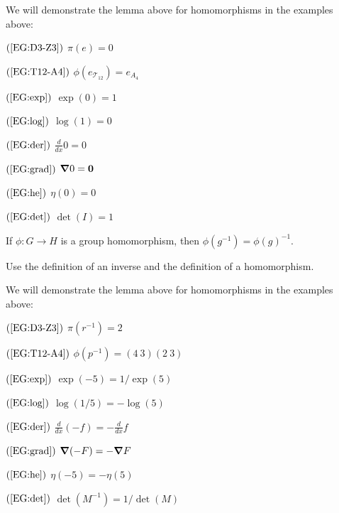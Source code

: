 \documentclass{ximera}
\begin{document}
\begin{example}
  We will demonstrate the lemma above for homomorphisms in the
  examples above:
  \begin{description}
    \begin{multicols}{2}
    \item[$(\ref{EG:D3-Z3})$] $\pi(e) = 0$
    \item[$(\ref{EG:T12-A4})$] $\phi(e_{\mathcal{T}_{12}}) = e_{A_4}$
    \item[$(\ref{EG:exp})$] $\exp(0) = 1$
    \item[$(\ref{EG:log})$] $\log(1) = 0$
    \item[$(\ref{EG:der})$] $\frac{d}{dx}0 = 0$
    \item[$(\ref{EG:grad})$] $\boldsymbol\nabla 0 = \mathbf{0}$
    \item[$(\ref{EG:he})$] $\eta(0) = 0$
    \item[$(\ref{EG:det})$] $\det(I) = 1$
    \end{multicols}
  \end{description}
\end{example}




\begin{lemma}\label{L:HPI}
  If $\phi:G\to H$ is a group homomorphism, then $\phi(g^{-1}) =
  \phi(g)^{-1}$.
  \begin{sketch}
    Use the definition of an inverse and the definition of a
    homomorphism.
  \end{sketch}
\end{lemma}

\begin{example}
  We will demonstrate the lemma above for homomorphisms in the
  examples above:
  \begin{description}
    \begin{multicols}{2}
    \item[$(\ref{EG:D3-Z3})$] $\pi(r^{-1}) = 2$
    \item[$(\ref{EG:T12-A4})$] $\phi(p^{-1}) = (4\ 3)(2 \ 3)$
    \item[$(\ref{EG:exp})$] $\exp(-5) = 1/\exp(5)$
    \item[$(\ref{EG:log})$] $\log(1/5) = -\log(5)$
    \item[$(\ref{EG:der})$] $\frac{d}{dx}(-f) = -\frac{d}{dx}f$
    \item[$(\ref{EG:grad})$] $\boldsymbol\nabla( -F) = -\boldsymbol\nabla F$
    \item[$(\ref{EG:he})$] $\eta(-5) = -\eta( 5)$
    \item[$(\ref{EG:det})$] $\det(M^{-1}) = 1/\det(M)$
    \end{multicols}
  \end{description}
\end{example}
\end{document}
